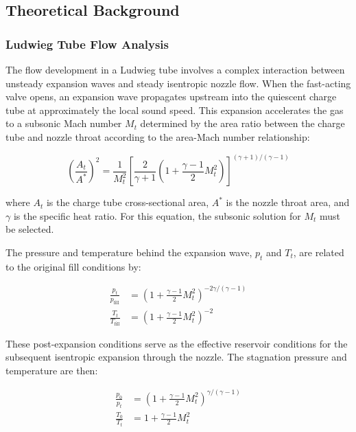 \subsection{Theoretical Background} \label{sec:introduction/theory}

\subsubsection{Ludwieg Tube Flow Analysis}

The flow development in a Ludwieg tube involves a complex interaction between unsteady expansion waves and steady isentropic nozzle flow. When the fast-acting valve opens, an expansion wave propagates upstream into the quiescent charge tube at approximately the local sound speed. This expansion accelerates the gas to a subsonic Mach number $M_t$ determined by the area ratio between the charge tube and nozzle throat according to the area-Mach number relationship:

\begin{equation}
    \left(\frac{A_t}{A^*}\right)^2 = \frac{1}{M_t^2} \left[\frac{2}{\gamma + 1}\left(1 + \frac{\gamma - 1}{2}M_t^2\right)\right]^{(\gamma+1)/(\gamma-1)}
    \label{eq:area-mach-tube}
\end{equation}

\noindent where $A_t$ is the charge tube cross-sectional area, $A^*$ is the nozzle throat area, and $\gamma$ is the specific heat ratio. For this equation, the subsonic solution for $M_t$ must be selected.

The pressure and temperature behind the expansion wave, $p_t$ and $T_t$, are related to the original fill conditions by:

\begin{align}
    \frac{p_t}{p_{\text{fill}}} &= \left(1 + \frac{\gamma - 1}{2}M_t^2\right)^{-2\gamma/(\gamma-1)} \label{eq:expansion-pressure} \\
    \frac{T_t}{T_{\text{fill}}} &= \left(1 + \frac{\gamma - 1}{2}M_t^2\right)^{-2} \label{eq:expansion-temperature}
\end{align}

These post-expansion conditions serve as the effective reservoir conditions for the subsequent isentropic expansion through the nozzle. The stagnation pressure and temperature are then:

\begin{align}
    \frac{p_0}{p_t} &= \left(1 + \frac{\gamma - 1}{2}M_t^2\right)^{\gamma/(\gamma-1)} \label{eq:stagnation-pressure} \\
    \frac{T_0}{T_t} &= 1 + \frac{\gamma - 1}{2}M_t^2 \label{eq:stagnation-temperature}
\end{align}

